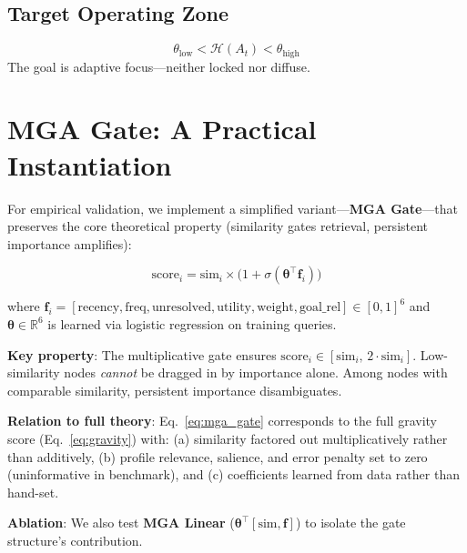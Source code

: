 \documentclass{article}
\newcommand{\entropy}{\mathcal{H}}
\begin{document}
\subsection{Target Operating Zone}

\begin{equation}
\theta_{\text{low}} < \entropy(A_t) < \theta_{\text{high}}
\end{equation}
The goal is adaptive focus---neither locked nor diffuse.

\section{MGA Gate: A Practical Instantiation}

For empirical validation, we implement a simplified variant---\textbf{MGA Gate}---that preserves the core theoretical property (similarity gates retrieval, persistent importance amplifies):

\begin{equation}
\text{score}_i = \text{sim}_i \times \bigl(1 + \sigma(\boldsymbol{\theta}^\top \mathbf{f}_i)\bigr)
\label{eq:mga_gate}
\end{equation}

where $\mathbf{f}_i = [\text{recency}, \text{freq}, \text{unresolved}, \text{utility}, \text{weight}, \text{goal\_rel}] \in [0,1]^6$ and $\boldsymbol{\theta} \in \mathbb{R}^6$ is learned via logistic regression on training queries.

\textbf{Key property}: The multiplicative gate ensures $\text{score}_i \in [\text{sim}_i,\, 2 \cdot \text{sim}_i]$. Low-similarity nodes \emph{cannot} be dragged in by importance alone. Among nodes with comparable similarity, persistent importance disambiguates.

\textbf{Relation to full theory}: Eq.~\ref{eq:mga_gate} corresponds to the full gravity score (Eq.~\ref{eq:gravity}) with: (a) similarity factored out multiplicatively rather than additively, (b) profile relevance, salience, and error penalty set to zero (uninformative in benchmark), and (c) coefficients learned from data rather than hand-set.

\textbf{Ablation}: We also test \textbf{MGA Linear} ($\boldsymbol{\theta}^\top [\text{sim}, \mathbf{f}]$) to isolate the gate structure's contribution.

\end{document}
